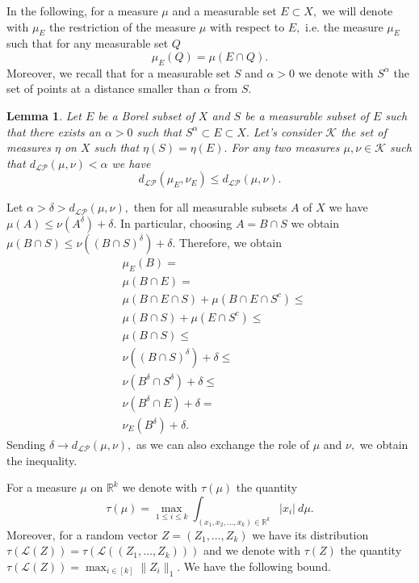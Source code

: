 \documentclass[11pt]{article}
\newtheorem{lemma}[theorem]{Lemma}
\def\R{\mathbb{R}}
\newcommand{\cK}{{\mathcal K}}  %
\begin{document}
In the following,  for a measure $\mu$ and a measurable set $E\subset X,$  we will denote with $\mu_E$ the restriction of the measure $\mu$ with respect to $E,$ i.e. the measure $\mu_E$ such that for any measurable set $Q$
\begin{equation}
    \mu_E(Q)=\mu(E\cap Q).
\end{equation}
Moreover, we recall that for a measurable set $S$ and $\alpha>0$ we denote with $S^{\alpha}$ the set of points at a distance smaller than $\alpha $ from $S$.

\begin{lemma}\label{LemmCntinuityProhRestriction}
Let $E$ be a Borel subset of $X$ and $S$ be a measurable subset of $ E$ such that there exists an $\alpha>0$ such that $S^{\alpha}\subset E \subset X.$  Let's consider $\cK$ the set of measures $\eta$ on $X$ such that $\eta(S)=\eta(E).$ For any two measures $\mu,\nu \in \cK$ %
such that $
d_{\mathcal{LP}}(\mu,\nu)<\alpha
$ we have 
$$
d_{\mathcal{LP}}(\mu_E,\nu_E)\leq d_{\mathcal{LP}}(\mu,\nu).
$$
\end{lemma}
\proof
Let $\alpha>\delta >d_{\mathcal{LP}}(\mu,\nu) ,$ then for all measurable subsets $A$ of $X$ we have $\mu(A)\leq \nu(A^{\delta})+\delta.$ In particular, choosing $A=B\cap S$  we obtain $\mu(B\cap S)\leq \nu((B\cap S)^{\delta})+\delta.$ Therefore, we obtain
$$\begin{aligned}
&\mu_E(B)=\\
   & \mu(B\cap E)=\\
   &\mu(B\cap E \cap S)+\mu(B\cap E \cap S^c)\leq \\
   &\mu(B\cap S)+\mu( E \cap S^c)\leq \\
   &\mu(B\cap S)\leq \\
   & \nu((B\cap S)^{\delta})+\delta\leq \\
  & \nu(B^{\delta}\cap S^{\delta})+\delta\leq \\
  & \nu(B^{\delta}\cap E)+\delta= \\
  & \nu_E(B^{\delta})+\delta.
\end{aligned}
$$
Sending $\delta \rightarrow d_{\mathcal{LP}}(\mu,\nu),$ as we can also exchange the role of $\mu $ and $\nu,$ we obtain the inequality.
\endproof

For a measure $\mu$ on $\R^k$ we denote with $\tau(\mu)$ the quantity
\begin{equation}\label{eqn:tau}\tau(\mu)=\max_{1\leq i\leq k} \int_{(x_1,x_2,\dots,x_k)\in\mathbb{R}^k}|x_i|~d\mu.\end{equation}
Moreover, for a random vector $Z=(Z_1,\ldots, Z_k)$ we have its distribution $\tau(\mathcal{L}(Z))=\tau(\mathcal{L}((Z_1,\ldots, Z_k)))$ and we denote with $\tau(Z)$ the quantity $\tau(\mathcal{L}(Z))=\max_{i\in [k]}\|Z_i\|_1.$ We have the following bound.
\end{document}
